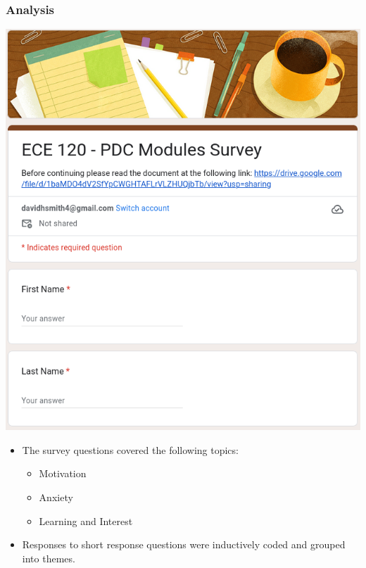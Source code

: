 \documentclass{beamer}
\begin{document}
\begin{frame}[fragile]
    \frametitle{Analysis}

    \begin{minipage}{0.45\textwidth}
      \includegraphics[width=\textwidth]{survey.png}
    \end{minipage}
    \begin{minipage}{0.54\textwidth}
        \begin{itemize}
            \item The survey questions covered the following topics:
            \begin{itemize}
                \item Motivation
                \item Anxiety
                \item Learning and Interest
            \end{itemize}
            \item Responses to short response questions were inductively coded and grouped into themes.
        \end{itemize}
    \end{minipage}

\end{frame}
\end{document}
